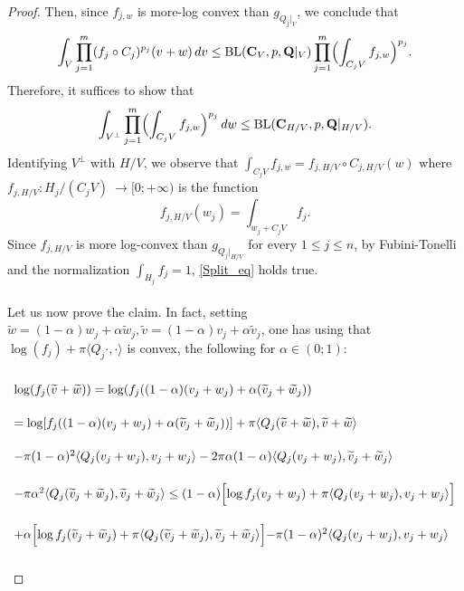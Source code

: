 \documentclass[11pt,a4paper,reqno]{amsart}
\numberwithin{equation}{section}
\theoremstyle{definition}
\newcommand{\nm}{\noalign{\smallskip}}
\newcommand{\ds}{\displaystyle}
\renewcommand{\tilde}{\widetilde}
\newcommand{\<}{\ensuremath \leq}
\renewcommand{\>}{\ensuremath \geq}
\renewcommand{\tilde}{\widetilde}
\begin{document}
\begin{proof}
    Then, since $f_{j,w}$ is more-log convex than $g_{Q_j|_V}$, we conclude that $$\int_V \prod_{j=1}^m (f_j \circ C_j)^{p_j}(v+w)\, dv \leq \mathrm{BL}(\textbf{C}_V,p,\textbf{Q}|_V)\prod_{j=1}^m \Bigl (\int_{C_jV}f_{j,w}\Bigl)^{p_j}.$$ Therefore, it suffices to show that \begin{equation} \label{Split_eq}\int_{V^\perp}\prod_{j=1}^m \Bigl( \int_{C_jV}f_{j,w}\Bigl)^{p_j}\, dw \leq \mathrm{BL}(\textbf{C}_{H/V},p,\textbf{Q}|_{H/V}).\end{equation} Identifying $V^\perp$ with $H/V$, we observe that $\ds \int_{C_jV}f_{j,w}=f_{j,H/V}\circ C_{j,H/V}(w)$ where $f_{j,H/V}:H_j/(C_jV)\ \longrightarrow [0;+\infty)$ is the function $$f_{j,H/V}(w_j)=\int_{w_j+C_jV}f_j.$$ 
    Since $f_{j,{H/V}}$ is more log-convex than $g_{Q_j|_{H/V}}$ for every $1 \leq j \leq n$, by Fubini-Tonelli and the normalization $\int_{H_j}f_j=1$, \cref{Split_eq} holds true. \\ \hfill \\ Let us now prove the claim. In fact, setting $\tilde w=(1-\alpha)w_j+\alpha \tilde w_j, \tilde v=(1-\alpha)v_j+\alpha \tilde v_j$, one has using that $\log(f_j)+\pi \langle Q_j \cdot,\cdot \rangle$ is convex, the following for $\alpha \in (0;1)$:  \begin{equation} \label{Log_Convexity_Superposition} \begin{array}{lll}
    \\ \log(f_j(\tilde v+\tilde w)) = \log(f_j((1-\alpha)(v_j+w_j)+\alpha(\tilde v_j+\tilde w_j)) \\ \\
    \nm 
    = \log[f_j((1-\alpha)(v_j+w_j)+\alpha(\tilde v_j+\tilde w_j))] +\pi \langle Q_j (\tilde v+\tilde w),\tilde v+\tilde w \rangle \\ \\
    \nm 
    -\pi(1-\alpha)^2 \langle Q_j(v_j+w_j),v_j+w_j \rangle-2\pi \alpha(1-\alpha)\langle Q_j(v_j+w_j),\tilde v_j+\tilde w_j \rangle   \\ \\
    \nm 
    -\pi \alpha^2 \langle Q_j(\tilde v_j+\tilde w_j),\tilde v_j+\tilde w_j \rangle \leq (1-\alpha)\Bigl [ \log f_j(v_j+w_j)+\pi \langle Q_j(v_j+w_j),v_j+w_j \rangle \Bigl] \\ \\
    \nm 
    +\alpha \Bigl [ \log f_j(\tilde v_j+\tilde w_j)+\pi \langle Q_j(\tilde v_j+\tilde w_j),\tilde v_j+\tilde w_j\rangle \Bigl]-\pi(1-\alpha)^2 \langle Q_j(v_j+w_j),v_j+w_j \rangle \\ \\

\end{array}
\end{equation}
\end{proof}
\end{document}
